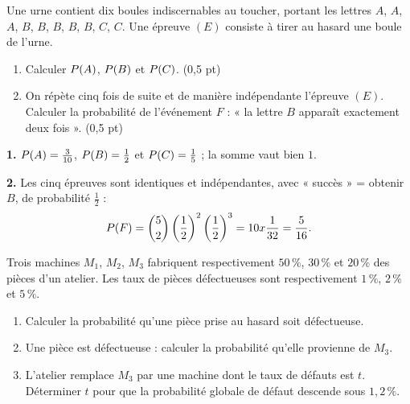 \begin{commeaubac}
Une urne contient dix boules indiscernables au toucher, portant les lettres
$A$, $A$, $A$, $B$, $B$, $B$, $B$, $B$, $C$, $C$. Une épreuve $(E)$ consiste à
tirer au hasard une boule de l'urne.

\begin{enumerate}[label=\textbf{\arabic*.}, leftmargin=*, itemsep=0.25em]
  \item Calculer $\proba{A}$, $\proba{B}$ et $\proba{C}$.
        \hfill\textup{(0,5 pt)}
  \item On répète cinq fois de suite et de manière indépendante l'épreuve
        $(E)$.
        Calculer la probabilité de l'événement $F$ : « la lettre $B$
        apparaît exactement deux fois ». \hfill\textup{(0,5 pt)}
\end{enumerate}

\medskip
{}
\end{commeaubac}

\begin{corrige}
\textbf{1.} $\proba{A} = \frac{3}{10}$, $\proba{B} = \frac12$ et
$\proba{C} = \frac15$ ; la somme vaut bien $1$.

\textbf{2.} Les cinq épreuves sont identiques et indépendantes, avec
« succès » = obtenir $B$, de probabilité $\frac12$ :
\[
  \proba{F} = \combi{2}{5}\left(\frac12\right)^{2}\left(\frac12\right)^{3}
  = 10 \times \frac{1}{32} = \frac{5}{16}.
\]
\end{corrige}

\begin{concours}
Trois machines $M_{1}$, $M_{2}$, $M_{3}$ fabriquent respectivement $50\,\%$,
$30\,\%$ et $20\,\%$ des pièces d'un atelier. Les taux de pièces défectueuses
sont respectivement $1\,\%$, $2\,\%$ et $5\,\%$.

\begin{enumerate}[label=\textbf{\arabic*.}, leftmargin=*, itemsep=0.25em]
  \item Calculer la probabilité qu'une pièce prise au hasard soit
        défectueuse.
  \item Une pièce est défectueuse : calculer la probabilité qu'elle provienne
        de $M_{3}$.
  \item L'atelier remplace $M_{3}$ par une machine dont le taux de défauts est
        $t$. Déterminer $t$ pour que la probabilité globale de défaut
        descende sous $1{,}2\,\%$.
\end{enumerate}
\end{concours}

